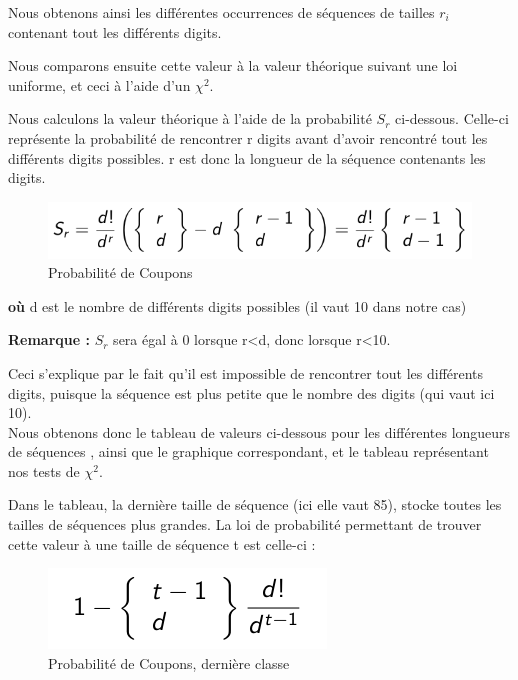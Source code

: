 \documentclass[10pt,a4paper]{article}
\begin{document}
Nous obtenons ainsi les différentes occurrences de séquences de tailles $r_i$ contenant tout les différents digits.

Nous comparons ensuite cette valeur à la valeur théorique suivant une loi uniforme, et ceci à l'aide d'un $\chi^2$.

Nous calculons la valeur théorique à l'aide de la probabilité $ S_r$ ci-dessous. Celle-ci représente la probabilité de rencontrer r digits avant d'avoir rencontré tout les différents digits possibles. r est donc la longueur de la séquence contenants les digits.

\begin{figure}[h]
		\centering
\includegraphics[scale=0.4]{images/formule.png}  
\caption{Probabilité de Coupons}
	\end{figure}

\textbf{où} d est le nombre de différents digits possibles (il vaut 10 dans notre cas)

\textbf{Remarque :} $S_r$ sera égal à 0 lorsque r<d, donc lorsque r<10.

 

Ceci s'explique par le fait qu'il est impossible de rencontrer tout les différents digits, puisque la séquence est plus petite que le nombre des digits (qui vaut ici 10). \\

Nous obtenons donc le tableau de valeurs ci-dessous pour les différentes longueurs de séquences , ainsi que le graphique correspondant, et le tableau représentant nos tests de $\chi^2$.

Dans le tableau, la dernière taille de séquence (ici elle vaut 85), stocke toutes les tailles de séquences plus grandes.
La loi de probabilité permettant de trouver cette valeur à une taille de séquence t est celle-ci :

\begin{figure}[h]
		\centering
\includegraphics[scale=0.4]{images/formule2.png}  
\caption{Probabilité de Coupons, dernière classe}
	\end{figure}
\end{document}
